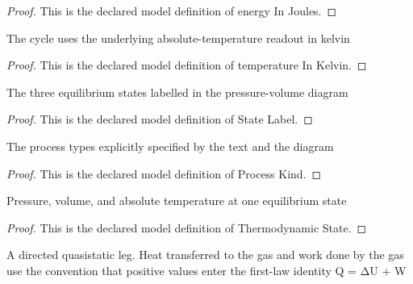 \begin{proof}
  This is the declared model definition of energy In Joules.
\end{proof}
\begin{definition}
  \label{def:physics:phyx-mini-0347:phyxminiproblems-problemphyxmini0347-temperatureinkelvin}
  The cycle uses the underlying absolute-temperature readout in kelvin
\end{definition}
\begin{proof}
  This is the declared model definition of temperature In Kelvin.
\end{proof}
\begin{definition}
  \label{def:physics:phyx-mini-0347:phyxminiproblems-problemphyxmini0347-statelabel}
  The three equilibrium states labelled in the pressure-volume diagram
\end{definition}
\begin{proof}
  This is the declared model definition of State Label.
\end{proof}
\begin{definition}
  \label{def:physics:phyx-mini-0347:phyxminiproblems-problemphyxmini0347-processkind}
  The process types explicitly specified by the text and the diagram
\end{definition}
\begin{proof}
  This is the declared model definition of Process Kind.
\end{proof}
\begin{definition}
  \label{def:physics:phyx-mini-0347:phyxminiproblems-problemphyxmini0347-thermodynamicstate}
  Pressure, volume, and absolute temperature at one equilibrium state
\end{definition}
\begin{proof}
  This is the declared model definition of Thermodynamic State.
\end{proof}
\begin{definition}
  \label{def:physics:phyx-mini-0347:phyxminiproblems-problemphyxmini0347-thermodynamicprocess}
  A directed quasistatic leg. Heat transferred to the gas and work done by the gas use the convention that positive values enter the first-law identity Q = ΔU + W
\end{definition}

